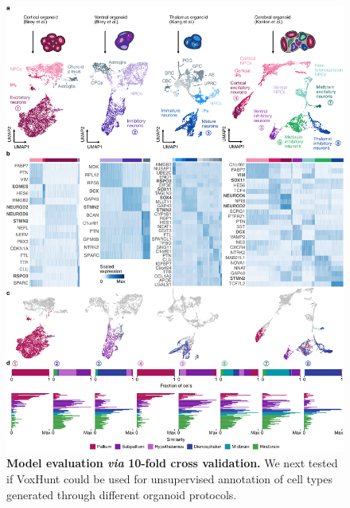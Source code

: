 \begin{figure}[b!]
    \centering
	\includegraphics[width=\textwidth]{figures/voxhunt/Figure_3}
    \caption{\textbf{Model evaluation \textit{via} 10-fold cross validation.} We next tested if VoxHunt could be used for unsupervised annotation of cell types generated through different organoid protocols.}
    \label{fig:vox3}
\end{figure}



